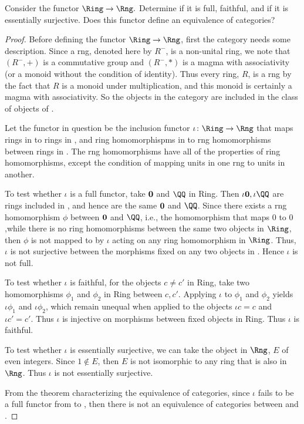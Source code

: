 \documentclass[main.tex]{subfiles}
\begin{document}
\begin{lemma}
	Consider the functor $\Ring\rightarrow \Rng.$ Determine if it is full, faithful, and if it is essentially surjective. Does this functor define an equivalence of categories?

\end{lemma}


\begin{proof}
	Before defining the functor $\Ring\rightarrow \Rng$, first the category \Rng 
	needs some description. Since a rng, denoted here by $R^-$, is a non-unital 
	ring, we note that $(R^-,+)$ is a commutative group and $(R^-,*)$ is a magma 
	with associativity (or a monoid without the condition of identity). Thus every 
	ring, $R$, is a rng by the fact that $R$ is a monoid under multiplication, and 
	this monoid is certainly a magma with associativity. So the objects in the 
	category \Ring are included in the class of objects of \Rng. 

	Let the functor in question be the inclusion functor $\iota\colon \Ring\rightarrow \Rng$ that maps rings in \Ring to rings in \Rng, and ring homomorphispms in \Ring to rng homomorphisms between rings in \Rng. The rng homomorphisms have all of the properties of ring homomorphisms, except the condition of mapping units in one rng to units in another. 

	To test whether $\iota$ is a full functor, take $\bold 0$ and  $\QQ$ in 
	Ring. Then $\iota \bold 0, \iota \QQ$ are rings included in \Rng, and hence 
	are the same $\bold 0$ and  $\QQ$. Since there exists a rng homomorphism 
	$\phi$ between $\bold 0$ and $\QQ$, i.e., the homomorphism that maps $0$ to 
	$0$,while there is no ring homomorphisms between the same two objects in $\Ring$, then $\phi$ is not mapped to by $\iota$ acting on any ring 
	homomorphism in $\Ring$.  Thus, $\iota$ is not surjective between the 
	morphisms fixed on any two objects in \Ring. Hence $\iota$ is not full.

	To test whether $\iota$ is faithful, for the objects $c \not= c'$ in Ring, take 
	two homomorphisms $\phi_1$ and $\phi_2$ in Ring between $c, c'$. Applying 
	$\iota$ to $\phi_1$ and $\phi_2$ yields $\iota \phi_1$ and $\iota \phi_2$, 
	which remain unequal when applied to the objects $\iota c = c$ and $\iota c' = 
	c'$. Thus $\iota$ is injective on morphisms between fixed objects in Ring. Thus 
	$\iota$ is faithful.

	To test whether $\iota$ is essentially surjective, we can take the object in 
	$\Rng$, $E$ of even integers. Since $1 \notin E$, then $E$ is not 
	isomorphic to any ring that is also in $\Rng$. Thus $\iota$ is not 
	essentially surjective.

	From the theorem characterizing the equivalence of categories, since $\iota$ fails to be a full functor from \Ring to \Rng, then there is not an equivalence of categories between \Ring and \Rng. 


\end{proof}	
\end{document}
